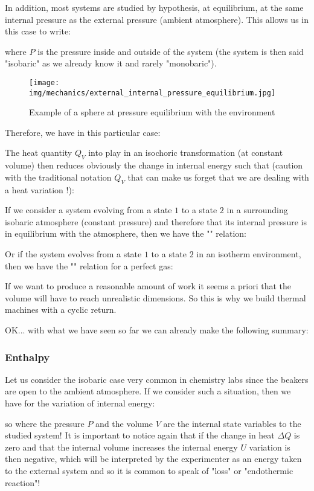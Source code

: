 	In addition, most systems are studied by hypothesis, at equilibrium, at the same internal pressure as the external pressure (ambient atmosphere). This allows us in this case to write:
	
	where $P$ is the pressure inside and outside of the system (the system is then said "isobaric" as we already know it and rarely "monobaric").
	
	\begin{figure}[H]
		\centering
		\texttt{[image: img/mechanics/external\_internal\_pressure\_equilibrium.jpg]}
		\caption[]{Example of a sphere at pressure equilibrium with the environment}
	\end{figure}
	Therefore, we have in this particular case:
	

	The heat quantity $Q_V$ into play in an isochoric transformation (at constant volume) then reduces obviously the change in internal energy such that (caution with the traditional notation $Q_V$ that can make us forget that we are dealing with a heat variation !):
	
	If we consider a system evolving from a state $1$ to a state $2$ in a surrounding isobaric atmosphere (constant pressure) and therefore that its internal pressure is in equilibrium with the atmosphere, then we have the "" relation:
	
	Or if the system evolves from a state $1$ to a state $2$ in an isotherm environment, then we have the "" relation for a perfect gas:
	
	If we want to produce a reasonable amount of work it seems a priori that the volume will have to reach unrealistic dimensions. So this is why we build thermal machines with a cyclic return.
	
	OK... with what we have seen so far we can already make the following summary:
	
	
	\subsubsection{Enthalpy}
	Let us consider the isobaric case very common in chemistry labs since the beakers are open to the ambient atmosphere. If we consider such a situation, then we have for the variation of internal energy:
	
	so where the pressure $P$ and the volume $V$ are the internal state variables to the studied system! It is important to notice again that if the change in heat $\Delta Q$ is zero and that the internal volume increases the internal energy $U$ variation is then negative, which will be interpreted by the experimenter as an energy taken to the external system and so it is common to speak of "loss" or "endothermic reaction"!
	
